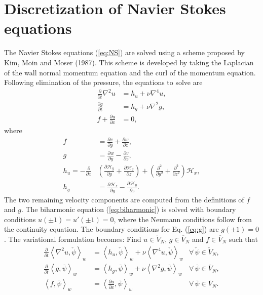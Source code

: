 \documentclass[11pt, oneside]{elsarticle}
\newcommand{\N}[1]{\check{#1}}
\newcommand{\D}[1]{\overline{#1}}
\begin{document}
\section{Discretization of Navier Stokes equations}
\label{sec:discretizationNS}
The Navier Stokes equations (\ref{eq:NS}) are solved using a scheme 
proposed by Kim, Moin and Moser (1987). This scheme is developed by taking the 
Laplacian of the wall normal momentum equation and the curl of the momentum 
equation. Following elimination of the pressure, the equations to solve are 
\begin{align}
\frac{\partial}{\partial t} \nabla^2 u &= h_u + \nu \nabla^4 u, 
\label{eq:biharmonic} \\
\frac{\partial g}{\partial t} &= h_g + \nu \nabla^2 g, \label{eq:g} \\
f + \frac{\partial u}{\partial x} &= 0, \label{eq:f}
\end{align}
where
\begin{align}
f &= \frac{\partial v}{\partial y} + \frac{\partial w}{\partial z}, \\
g &= \frac{\partial w}{\partial y} - \frac{\partial v}{\partial z}, \\
h_u = -\frac{\partial}{\partial x} &\left( \frac{\partial 
\mathcal{H}_y}{\partial y} + \frac{\partial \mathcal{H}_z}{\partial z} \right) 
+ \left(\frac{\partial^2}{\partial y^2} + \frac{\partial^2}{\partial z^2} 
\right) \mathcal{H}_x ,
\\
h_g &= \frac{\partial \mathcal{H}_z}{\partial y} - \frac{\partial 
\mathcal{H}_y}{\partial z}.
\end{align}
The two remaining velocity components are computed from the definitions of $f$ 
and $g$. The biharmonic equation (\ref{eq:biharmonic}) is solved with boundary 
conditions $u(\pm 1) = u'(\pm 1) = 0$, where the Neumann conditions follow 
from the continuity equation. The boundary conditions for Eq. (\ref{eq:g}) are 
$g(\pm 1) = 0$. The variational formulation becomes: Find ${u} \in 
\N{V}_N$, ${g} \in \D{V}_N$ and ${f} \in \D{V}_N$ such that
\begin{align}
	\frac{\partial }{\partial t} \left< \nabla^2 u, \N{\psi}\right>_w &= 
	\left<h_u, \N{\psi} \right>_w + \nu \left<\nabla^4u, \N{\psi}\right>_w 
	&\forall \,\N{\psi} \in \N{V}_N, \label{eq:u1} \\
	\frac{\partial}{\partial t}\left<g, \D{\psi}\right>_w &= \left<h_g, 
	\D{\psi}\right>_w + \nu 
	\left<\nabla^2 g, \D{\psi}\right>_w &\forall \, \D{\psi} \in \D{V}_N ,
	\label{eq:g1} \\
	\left<f, \D{\psi}\right>_w &= \left<\frac{\partial u}{\partial x}, 
	\D{\psi}\right>_w &\forall \, \D{\psi} \in \D{V}_N. \label{eq:f1}
\end{align}
\end{document}
